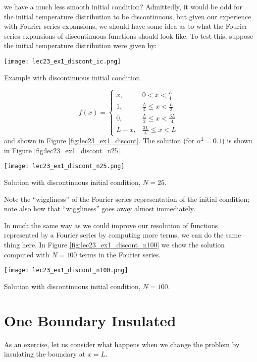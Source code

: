  we have a much less smooth initial condition?  Admittedly, it would be odd for the initial temperature distribution to be discontinuous, but given our experience with Fourier series expansions, we should have some idea as to what the Fourier series expansions of discontinuous functions should look like.  To test this, suppose the initial temperature distribution were given by:
\begin{marginfigure}
\texttt{[image: lec23\_ex1\_discont\_ic.png]}
\caption{Example with discontinuous initial condition.}
\label{fig:lec23_ex1_discont}
\end{marginfigure}
\begin{equation*}
f(x) = 
\begin{cases}
x, & 0 < x < \frac{L}{4} \\
1, & \frac{L}{4} \le x < \frac{L}{2} \\
0, & \frac{L}{2} \le x < \frac{3L}{4} \\
L-x, & \frac{3L}{4} \le x < L

\end{cases}
\end{equation*}
and shown in Figure \ref{fig:lec23_ex1_discont}. The solution (for $\alpha^2=0.1$) is shown in Figure \ref{fig:lec23_ex1_discont_n25}.
\begin{marginfigure}
\texttt{[image: lec23\_ex1\_discont\_n25.png]}
\caption{Solution with discontinuous initial condition, $N=25$.}
\label{fig:lec23_ex1_discont_n25}
\end{marginfigure}
Note the ``wiggliness'' of the Fourier series representation of the initial condition; note also how that ``wiggliness'' goes away almost immediately.

In much the same way as we could improve our resolution of functions represented by a Fourier series by computing more terms, we can do the same thing here.  In Figure \ref{fig:lec23_ex1_discont_n100} we show the solution computed with $N=100$ terms in the Fourier series.
\begin{marginfigure}
\texttt{[image: lec23\_ex1\_discont\_n100.png]}
\caption{Solution with discontinuous initial condition, $N=100$.}
\label{fig:lec23_ex1_discont_n100}
\end{marginfigure}

\section{One Boundary Insulated}
As an exercise, let us consider what happens when we change the problem by insulating the boundary at $x=L$.  

